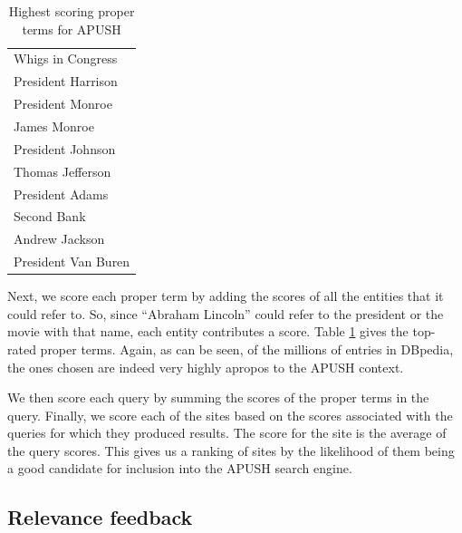 \documentclass[pdfpagelabels=false,plainpages=true]{acm_proc_article-sp}
\begin{document}
\begin{table}
\begin{center}
\begin{tabular}{|l|} \hline
Whigs in Congress \\
President Harrison \\
President Monroe \\
James Monroe \\
President Johnson \\
Thomas Jefferson \\
President Adams \\
Second Bank \\
Andrew Jackson \\
President Van Buren \\
\hline\end{tabular}
\caption{Highest scoring proper terms for APUSH}
\label{tab-terms}
\end{center}
\end{table}



Next, we score each proper term by adding the scores of all the entities that it
could refer to. So, since ``Abraham Lincoln'' could refer to the president or the
movie with that name, each entity contributes a score. Table \ref{tab-terms}
gives the top-rated proper terms. Again, as can be seen, of the millions
of entries in DBpedia, the ones chosen are indeed very highly apropos to the
APUSH context.  


We then score each query by summing the scores of the proper terms in the query. Finally, we
score each of the sites based on the scores associated with the queries for
which they produced results. The score for the site is the average of the query
scores. This gives us a ranking of sites by the likelihood of them being a good
candidate for inclusion into the APUSH search engine. 

\subsection{Relevance feedback}
\end{document}
